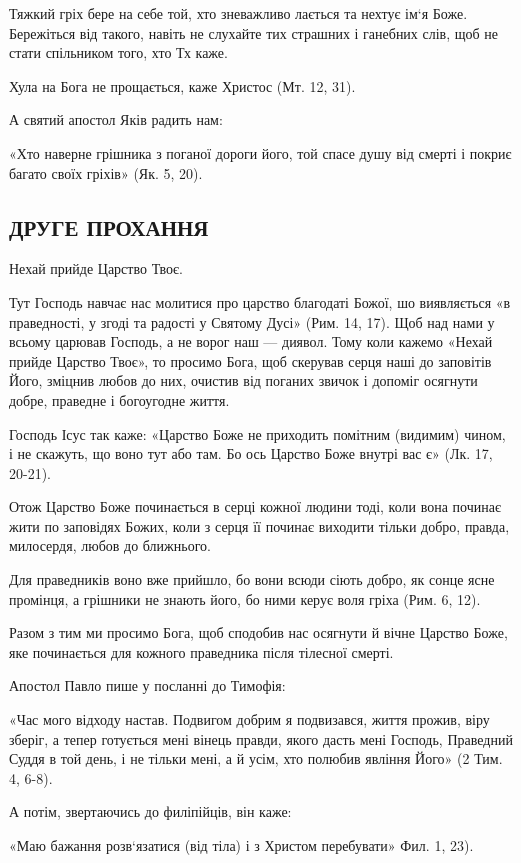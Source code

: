 \documentclass[main.tex]{subfiles}
\begin{document}
Тяжкий гріх бере на себе той, хто зневажливо лається та нехтує ім`я Боже. Бережіться від такого, навіть не слухайте тих страшних і ганебних слів, щоб не стати спільником того, хто Тх каже.

Хула на Бога не прощається, каже Христос (Мт. 12, 31).

А святий апостол Яків радить нам:

«Хто наверне грішника з поганої дороги його, той спасе душу від смерті і покриє багато своїх гріхів» (Як. 5, 20).
 
\subsection{ДРУГЕ ПРОХАННЯ}

Нехай прийде Царство Твоє.

Тут Господь навчає нас молитися про царство благодаті Божої, шо виявляється «в праведності, у згоді та радості у Святому Дусі» (Рим. 14, 17). Щоб над нами у всьому царював Господь, а не ворог наш — диявол. Тому коли кажемо «Нехай прийде Царство Твоє», то просимо Бога, щоб скерував серця наші до заповітів Його, зміцнив любов до них, очистив від поганих звичок і допоміг осягнути добре, праведне і богоугодне життя.

Господь Ісус так каже: «Царство Боже не приходить помітним (видимим) чином, і не скажуть, що воно тут або там. Бо ось Царство Боже внутрі вас є» (Лк. 17, 20-21).

Отож Царство Боже починається в серці кожної людини тоді, коли вона починає жити по заповідях Божих, коли з серця її починає виходити тільки добро, правда, милосердя, любов до ближнього.

Для праведників воно вже прийшло, бо вони всюди сіють добро, як сонце ясне промінця, а грішники не знають його, бо ними керує воля гріха (Рим. 6, 12).

Разом з тим ми просимо Бога, щоб сподобив нас осягнути й вічне Царство Боже, яке починається для кожного праведника після тілесної смерті.

Апостол Павло пише у посланні до Тимофія:

«Час мого відходу настав. Подвигом добрим я подвизався, життя прожив, віру зберіг, а тепер готується мені вінець правди, якого дасть мені Господь, Праведний Суддя в той день, і не тільки мені, а й усім, хто полюбив явління Його» (2 Тим. 4, 6-8).

А потім, звертаючись до филіпійців, він каже:

«Маю бажання розв`язатися (від тіла) і з Христом перебувати» Фил. 1, 23).
\end{document}
